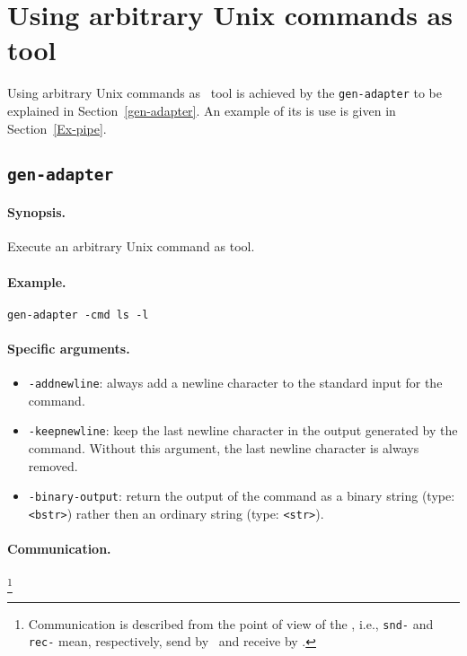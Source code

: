 
\section{\label{ToolsFromUnix}Using arbitrary Unix commands as tool}

Using arbitrary Unix commands as \TB\ tool is achieved by the {\tt gen-adapter}
to be explained in Section~\ref{gen-adapter}.
An example of its is use is given in Section~\ref{Ex-pipe}.


\subsection{\label{gen-adapter}{\tt gen-adapter}}

\paragraph{Synopsis.} Execute an arbitrary Unix command as tool.

\paragraph{Example.} {\tt gen-adapter -cmd ls -l}

\paragraph{Specific arguments.}
\begin{itemize}
\item {\tt -addnewline}: always add a newline character to the standard input for the command.
\item {\tt -keepnewline}: keep the last newline character
in the output generated by the command. Without this argument, 
the last newline character is always removed.
\item {\tt -binary-output}: return the output of the command
as a binary string (type: {\tt <bstr>}) rather then an ordinary string
(type: {\tt <str>}).
\end{itemize}

\paragraph{Communication.}  \hspace{-0.3cm}\footnote{Communication is described
from the point of view of the \TB, i.e., {\tt snd-} and {\tt rec-}
mean, respectively, send by \TB\ and receive by \TB.}

